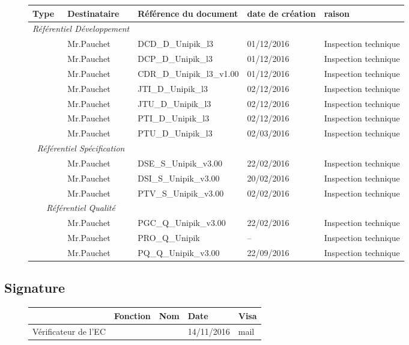 \documentclass[asi, sansVersion]{picInsa}
\begin{document}
\begin{figure}[H]
		\centering
		\begin{tabularx}{17cm}{|X|X|p{5cm}|p{2cm}|X|}
		\hline
		\rowcolor[gray]{0.85}Type & Destinataire & Référence du document & date de création & raison\\
		\hline
		\multicolumn{2}{|c|}{\textit{Référentiel Développement}}\\
		\hline 
		\DCD & Mr.Pauchet & DCD\_D\_Unipik\_l3 & 01/12/2016 & Inspection technique \\
		\DCP & Mr.Pauchet & DCP\_D\_Unipik\_l3 & 01/12/2016 & Inspection technique \\	
		\CDR & Mr.Pauchet & CDR\_D\_Unipik\_l3\_v1.00 & 01/12/2016 & Inspection technique \\
		\JTI & Mr.Pauchet & JTI\_D\_Unipik\_l3 & 02/12/2016 & Inspection technique \\
		\JTU & Mr.Pauchet & JTU\_D\_Unipik\_l3 & 02/12/2016 & Inspection technique \\
		\PTI & Mr.Pauchet & PTI\_D\_Unipik\_l3 & 02/12/2016 & Inspection technique \\
		\PTU & Mr.Pauchet & PTU\_D\_Unipik\_l3 & 02/03/2016 & Inspection technique \\
		\hline 
		\multicolumn{2}{|c|}{\textit{Référentiel Spécification}}\\
		\hline
		\DSE & Mr.Pauchet & DSE\_S\_Unipik\_v3.00 & 22/02/2016 & Inspection technique \\
		\DSI & Mr.Pauchet & DSI\_S\_Unipik\_v3.00 & 20/02/2016 & Inspection technique \\
		\PTV & Mr.Pauchet & PTV\_S\_Unipik\_v3.00 & 02/02/2016 & Inspection technique \\	
		\hline 
		\multicolumn{2}{|c|}{\textit{Référentiel Qualité}}\\
		\hline
		\PGC & Mr.Pauchet & PGC\_Q\_Unipik\_v3.00 & 22/02/2016 & Inspection technique \\ 
		\PRO & Mr.Pauchet & PRO\_Q\_Unipik & -- & Inspection technique \\
		\PQ & Mr.Pauchet & PQ\_Q\_Unipik\_v3.00 & 22/09/2016 & Inspection technique \\
		\hline 
		\end{tabularx}
\end{figure}

\subsection*{Signature}

\begin{figure}[H]
		\centering
		\begin{tabularx}{17cm}{|p{4cm}|X|X|X|X|}
		\hline
		\rowcolor[gray]{0.85}& Fonction & Nom & Date & Visa \\
		\hline
		 Vérificateur de l'EC & \CP & \Pierre & 14/11/2016 & mail \\
		\hline
		\end{tabularx}
\end{figure}
\end{document}
